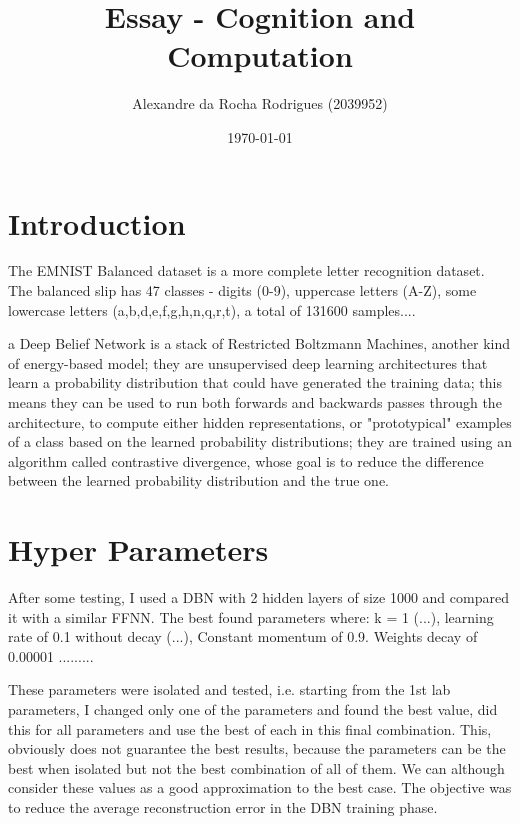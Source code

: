 \documentclass[a4paper, 11pt]{article}
\begin{document}
	
	\title{Essay - Cognition and Computation }
	\author{{\small Alexandre da Rocha Rodrigues (2039952)}}
	\date{\today}
	\maketitle
	
	\section{Introduction}
	
		The EMNIST\cite{emnist} Balanced dataset is a more complete letter recognition dataset.
		The balanced slip has 47 classes - digits (0-9), uppercase letters (A-Z), some lowercase letters (a,b,d,e,f,g,h,n,q,r,t), a total of 131600 samples....
		
			
		a Deep Belief Network is a stack of Restricted Boltzmann Machines, another kind of energy-based model;
		they are unsupervised deep learning architectures that learn a probability distribution that could have generated the training data;
		this means they can be used to run both forwards and backwards passes through the architecture, to compute either hidden representations, or "prototypical" examples of a class based on the learned probability distributions;
		they are trained using an algorithm called contrastive divergence, whose goal is to reduce the difference between the learned probability distribution and the true one.
		
	
	\section{Hyper Parameters}
		After some testing, I used a DBN with 2 hidden layers of size 1000 and compared it with a similar FFNN.
		The best found parameters where: k = 1 (...), learning rate of 0.1 without decay (...), 
		Constant momentum of 0.9.
		Weights decay of 0.00001 
		.........
		
		These parameters were isolated and tested, i.e. starting from the 1st lab parameters, I changed only one of the parameters and found the best value, did this for all parameters and use the best of each in this final combination.
		This, obviously does not guarantee the best results, because the parameters can be the best when isolated but not the best combination of all of them.
		We can although consider these values as a good approximation to the best case.
		The objective was to reduce the average reconstruction error in the DBN training phase.
		
\end{document}

